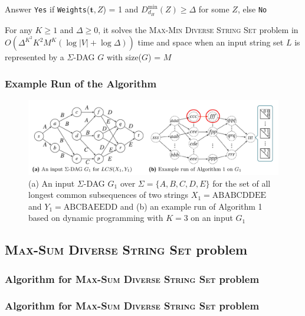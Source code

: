\documentclass{beamer}
\begin{document}
\begin{frame}
\begin{algorithm}[H]
{\begin{algorithmic}[1]
                        \EndFor
                    \EndFor
                \EndFor
            \EndFor
            \State Answer \texttt{Yes} if \texttt{Weights}($\mathbf{t}, Z$) = 1 and $D_{d_H}^{\text{min}}(Z) \geq \Delta$ for some $Z$, else \texttt{No}
        \end{algorithmic}}
    \end{algorithm}
    \small{For any $K \geq 1$ and $\Delta \geq 0$, it solves the \textsc{Max-Min Diverse String Set} problem in $O(\Delta^{K^2} K^2 M^K (\log |V| + \log \Delta))$ time and space when an input string set $L$ is represented by a $\Sigma$-DAG $G$ with size($G$) = $M$}
\end{frame}

\begin{frame}
    \frametitle{Example Run of the Algorithm}
        \begin{figure}[h]
            \centering
            \includegraphics[width=1\textwidth]{6Kc2XEQ.png}
            \caption{(a) An input $\Sigma$-DAG $G_1$ over $\Sigma = \{A, B, C, D, E\}$ for the set of all longest common subsequences of two strings $X_1 = \text{ABABCDDEE}$ and $Y_1 = \text{ABCBAEEDD}$ and (b) an example run of Algorithm 1 based on dynamic programming with $K = 3$ on an input $G_1$}
            \label{fig:example}
        \end{figure}




\end{frame}


\subsection{\textsc{Max-Sum Diverse String Set} problem}
\begin{frame}
    \frametitle{Algorithm for \textsc{Max-Sum Diverse String Set} problem}

\end{frame}

\begin{frame}
    \frametitle{Algorithm for \textsc{Max-Sum Diverse String Set} problem}

\end{frame}
\end{document}
